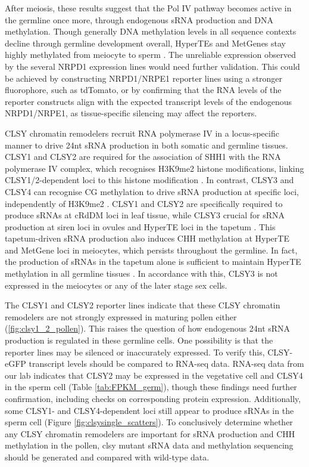 After meiosis, these results suggest that the Pol IV pathway becomes active in the germline once more, through endogenous sRNA production and DNA methylation. Though generally DNA methylation levels in all sequence contexts decline through germline development overall, HyperTEs and MetGenes stay highly methylated from meiocyte to sperm \citep{RN17,RN199}. The unreliable expression observed by the several NRPD1 expression lines would need further validation. This could be achieved by constructing NRPD1/NRPE1 reporter lines using a stronger fluorophore, such as tdTomato, or by confirming that the RNA levels of the reporter constructs align with the expected transcript levels of the endogenous NRPD1/NRPE1, as tissue-specific silencing may affect the reporters.

CLSY chromatin remodelers recruit RNA polymerase IV in a locus-specific manner to drive 24nt sRNA production in both somatic and germline tissues. CLSY1 and CLSY2 are required for the association of SHH1 with the RNA polymerase IV complex, which recognises H3K9me2 histone modifications, linking CLSY1/2-dependent loci to this histone modification \citep{RN23}. In contrast, CLSY3 and CLSY4 can recognise CG methylation to drive sRNA production at specific loci, independently of H3K9me2 \citep{RN23}. CLSY1 and CLSY2 are specifically required to produce sRNAs at cRdDM loci in leaf tissue, while CLSY3 crucial for sRNA production at siren loci in ovules and HyperTE loci in the tapetum \citep{RN162,RN23,RN187}. This tapetum-driven sRNA production also induces CHH methylation at HyperTE and MetGene loci in meiocytes, which persists throughout the germline. In fact, the production of sRNAs in the tapetum alone is sufficient to maintain HyperTE methylation in all germline tissues \citep{RN187}. In accordance with this, CLSY3 is not expressed in the meiocytes or any of the later stage sex cells. 

The CLSY1 and CLSY2 reporter lines indicate that these CLSY chromatin remodelers are not strongly expressed in maturing pollen either (\ref{fig:clsy1_2_pollen}). This raises the question of how endogenous 24nt sRNA production is regulated in these germline cells. One possibility is that the reporter lines may be silenced or inaccurately expressed. To verify this, CLSY-eGFP transcript levels should be compared to RNA-seq data. RNA-seq data from our lab indicates that CLSY2 may be expressed in the vegetative cell and CLSY4 in the sperm cell (Table \ref{tab:FPKM_germ}), though these findings need further confirmation, including checks on corresponding protein expression. Additionally, some CLSY1- and CLSY4-dependent loci still appear to produce sRNAs in the sperm cell (Figure \ref{fig:clsysingle_scatters}). To conclusively determine whether any CLSY chromatin remodelers are important for sRNA production and CHH methylation in the pollen, clsy mutant sRNA data and methylation sequencing should be generated and compared with wild-type data.

